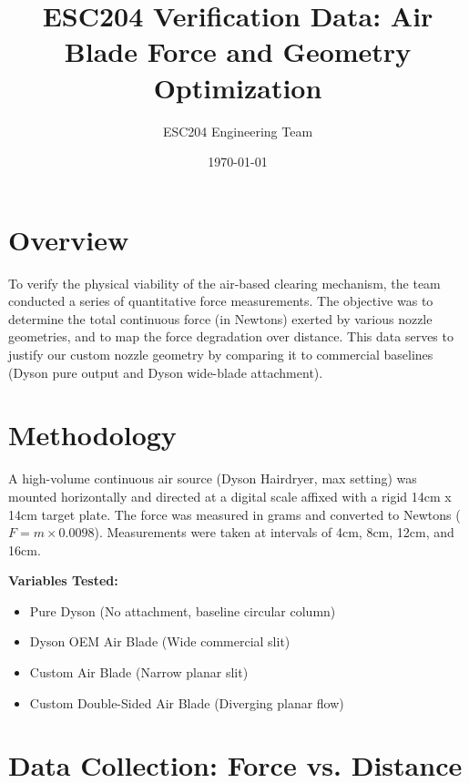\documentclass{article}
\title{ESC204 Verification Data: Air Blade Force and Geometry Optimization}
\author{ESC204 Engineering Team}
\date{\today}
\begin{document}
\maketitle

\section{Overview}
To verify the physical viability of the air-based clearing mechanism, the team conducted a series of quantitative force measurements. The objective was to determine the total continuous force (in Newtons) exerted by various nozzle geometries, and to map the force degradation over distance. This data serves to justify our custom nozzle geometry by comparing it to commercial baselines (Dyson pure output and Dyson wide-blade attachment).

\section{Methodology}
A high-volume continuous air source (Dyson Hairdryer, max setting) was mounted horizontally and directed at a digital scale affixed with a rigid 14cm x 14cm target plate. The force was measured in grams and converted to Newtons ($F = m \times 0.0098$). Measurements were taken at intervals of 4cm, 8cm, 12cm, and 16cm.

\textbf{Variables Tested:}
\begin{itemize}
    \item Pure Dyson (No attachment, baseline circular column)
    \item Dyson OEM Air Blade (Wide commercial slit)
    \item Custom Air Blade (Narrow planar slit)
    \item Custom Double-Sided Air Blade (Diverging planar flow)
\end{itemize}

\section{Data Collection: Force vs. Distance}
\end{document}
